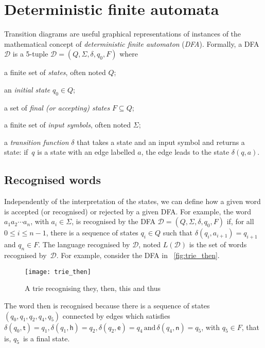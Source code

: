\section{Deterministic finite automata}

Transition diagrams are useful graphical representations of instances
of the mathematical concept of \emph{deterministic finite automaton}
(\emph{DFA}). Formally, a DFA \(\mathcal{D}\) is a 5-tuple
\(\mathcal{D} = (Q, \Sigma, \delta, q_0, F)\) where
\begin{enumerate*}

  \item a finite set of \emph{states}, often noted \(Q\);

  \item an \emph{initial state} \(q_0 \in Q\);

  \item a set of \emph{final (\emph{or} accepting)
  states} \(F \subseteq Q\);

  \item a finite set of \emph{input symbols}, often noted \(\Sigma\);

  \item a \emph{transition function} \(\delta\) that takes a state and
    an input symbol and returns a state: if~\(q\) is a state with an
    edge labelled \(a\), the edge leads to the state \(\delta(q, a)\).

\end{enumerate*}

\subsection*{Recognised words}

Independently of the interpretation of the states, we can define how a
given word is accepted (or recognised) or rejected by a given DFA. For
example, the word \(a_1 a_2 \cdots a_n\), with \(a_i \in \Sigma\), is
recognised by the DFA \(\mathcal{D} = (Q, \Sigma, \delta, q_0, F)\)
if, for all \(0 \leqslant i \leqslant n-1\), there is a sequence of
states \(q_i \in Q\) such that \(\delta (q_i, a_{i+1}) = q_{i+1}\) and
\(q_n \in F\). The language recognised by \(\mathcal{D}\), noted
\(L(\mathcal{D})\) is the set of words recognised
by~\(\mathcal{D}\). For example, consider the DFA in
\fig~\vref{fig:trie_then}.
\begin{figure}[b]
\centering
\texttt{[image: trie\_then]}
\caption{A trie recognising \textsf{they}, \textsf{then},
  \textsf{this} and \textsf{thus}}
\label{fig:trie_then}
\end{figure}
The word \textsf{then} is recognised because there is a sequence of
states \((q_0, q_1, q_2, q_4, q_5)\) connected by edges which
satisfies \(\delta (q_0, \textsf{t}) = q_1, \delta (q_1, \textsf{h}) =
q_2, \delta (q_2, \textsf{e}) = q_4 \,\text{and}\, \delta (q_4,
\textsf{n}) = q_5\), with \(q_5 \in F\), that is, \(q_5\)~is a final
state.


